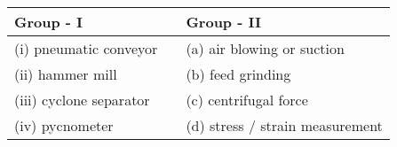 \begin{tabular}{|l|l|l|}
\hline
\textbf{Group - I} & \hspace{1cm} & \textbf{Group - II}\\
\hline
(i) pneumatic conveyor && (a) air blowing or suction\\
(ii) hammer mill && (b) feed grinding\\
(iii) cyclone separator && (c) centrifugal force\\
(iv) pycnometer && (d) stress / strain measurement\\
\hline
\end{tabular}